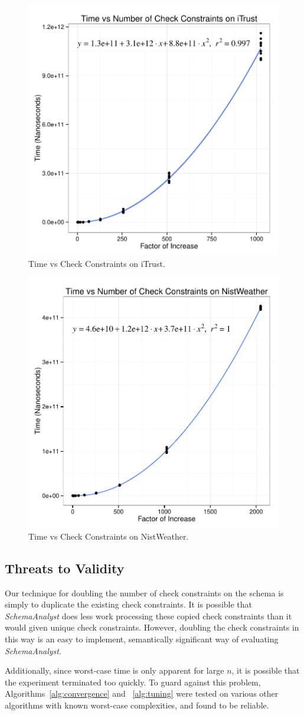 \documentclass[smallextended]{svjour3}       %
\begin{document}
\begin{figure}
\centering
  \centering
  \includegraphics[width=.5\linewidth]{iTrustChecks.pdf}
  \caption{Time vs Check Constraints on iTrust.}
  \label{fig:iTrust}
\end{figure}
\begin{figure}
  \centering
  \includegraphics[width=.5\linewidth]{NistWeatherChecks.pdf}
  \caption{Time vs Check Constraints on NistWeather.}
  \label{fig:NistWeather}
\end{figure}

\subsection*{Threats to Validity}
Our technique for doubling the number of check constraints on the schema
is simply to duplicate the existing check constraints. It is possible
that \textit{SchemaAnalyst} does less work processing these copied check
constraints than it would given unique check constraints. However,
doubling the check constraints in this way is an easy to implement,
semantically significant way of evaluating \textit{SchemaAnalyst}.

Additionally, since worst-case time is only apparent for large $n$, 
it is possible that the experiment terminated too quickly.  To guard 
against this problem, Algorithms~\ref{alg:convergence} and ~\ref{alg:tuning}
were tested on various other algorithms with known worst-case complexities, and 
found to be reliable.
\end{document}
